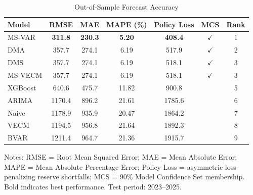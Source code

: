 \begin{table}[htbp]
\centering
\small
\caption{Out-of-Sample Forecast Accuracy}
\label{tab:accuracy}
\begin{tabular}{lcccccc}
\toprule
Model & RMSE & MAE & MAPE (\%) & Policy Loss & MCS & Rank \\
\midrule
MS-VAR & \textbf{311.8} & \textbf{230.3} & \textbf{5.20} & \textbf{408.4} & $\checkmark$ & 1 \\
DMA & 357.7 & 274.1 & 6.19 & 517.9 & $\checkmark$ & 2 \\
DMS & 357.7 & 274.1 & 6.19 & 518.1 & $\checkmark$ & 3 \\
MS-VECM & 357.7 & 274.1 & 6.19 & 518.1 & $\checkmark$ & 3 \\
XGBoost & 640.6 & 475.7 & 11.82 & 900.8 &  & 5 \\
ARIMA & 1170.4 & 896.2 & 21.61 & 1785.6 &  & 6 \\
Naive & 1178.9 & 935.9 & 20.47 & 1864.2 &  & 7 \\
VECM & 1194.5 & 956.8 & 21.64 & 1892.3 &  & 8 \\
BVAR & 1211.4 & 964.7 & 21.36 & 1915.7 &  & 9 \\
\bottomrule
\end{tabular}
\begin{tablenotes}
\small
\item Notes: RMSE = Root Mean Squared Error; MAE = Mean Absolute Error; 
MAPE = Mean Absolute Percentage Error; Policy Loss = asymmetric loss penalizing reserve shortfalls; 
MCS = 90\% Model Confidence Set membership. 
Bold indicates best performance. Test period: 2023--2025.
\end{tablenotes}
\end{table}